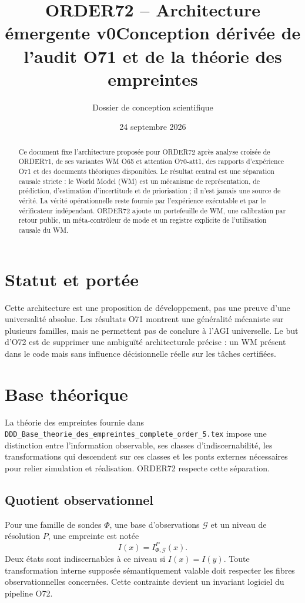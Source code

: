 \documentclass[11pt,a4paper]{article}
\title{ORDER72 -- Architecture émergente v0\newline\large Conception dérivée de l'audit O71 et de la théorie des empreintes}
\author{Dossier de conception scientifique}
\date{24 septembre 2026}
\begin{document}
\maketitle
\begin{abstract}
Ce document fixe l'architecture proposée pour ORDER72 après analyse croisée de ORDER71, de ses variantes WM O65 et attention O70-att1, des rapports d'expérience O71 et des documents théoriques disponibles. Le résultat central est une séparation causale stricte : le World Model (WM) est un mécanisme de représentation, de prédiction, d'estimation d'incertitude et de priorisation ; il n'est jamais une source de vérité. La vérité opérationnelle reste fournie par l'expérience exécutable et par le vérificateur indépendant. ORDER72 ajoute un portefeuille de WM, une calibration par retour public, un méta-contrôleur de mode et un registre explicite de l'utilisation causale du WM.
\end{abstract}
\tableofcontents
\section{Statut et portée}
Cette architecture est une proposition de développement, pas une preuve d'une universalité absolue. Les résultats O71 montrent une généralité mécaniste sur plusieurs familles, mais ne permettent pas de conclure à l'AGI universelle. Le but d'O72 est de supprimer une ambiguïté architecturale précise : un WM présent dans le code mais sans influence décisionnelle réelle sur les tâches certifiées.
\section{Base théorique}
La théorie des empreintes fournie dans \texttt{DDD\_Base\_theorie\_des\_empreintes\_complete\_order\_5.tex} impose une distinction entre l'information observable, ses classes d'indiscernabilité, les transformations qui descendent sur ces classes et les ponts externes nécessaires pour relier simulation et réalisation. ORDER72 respecte cette séparation.
\subsection{Quotient observationnel}
Pour une famille de sondes $\Phi$, une base d'observations $\mathcal G$ et un niveau de résolution $P$, une empreinte est notée
\[
I(x)=I_{\Phi,\mathcal G}^{P}(x).
\]
Deux états sont indiscernables à ce niveau si $I(x)=I(y)$. Toute transformation interne supposée sémantiquement valable doit respecter les fibres observationnelles concernées. Cette contrainte devient un invariant logiciel du pipeline O72.
\end{document}
